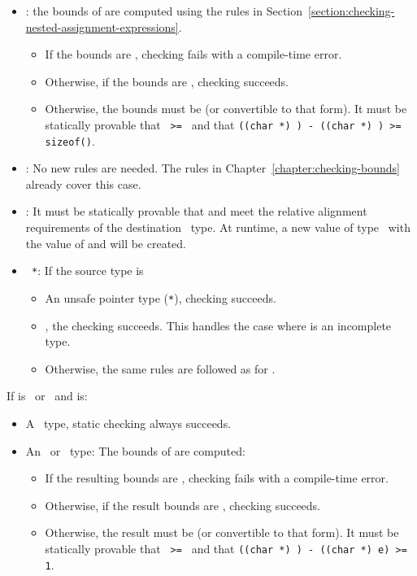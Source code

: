 \begin{itemize}
\item \ptrT: the bounds of  are computed using the rules
in Section~\ref{section:checking-nested-assignment-expressions}.
\begin{itemize}
\item If the bounds are \boundsnone, checking fails with a compile-time
error.
\item Otherwise, if the bounds are \boundsany, checking 
succeeds.
\item Otherwise, the bounds must be  (or convertible
to that form).  It must be statically provable that \texttt{ >= }
and that {\texttt{((char *) ) - ((char *) ) >= sizeof()}}.    
\end{itemize}
\item \arrayptrT: No new rules are needed.   The rules in
Chapter~\ref{chapter:checking-bounds} already cover this case.
\item \arrayviewT: It must be statically provable that 
and  meet the relative alignment requirements of
the destination \arrayview\ type.  At runtime, a new value of
type \arrayviewT\ with the value of  and  will be created.
\item \texttt{ *}: If the source type  is
\begin{itemize}
\item An unsafe pointer type (\texttt{*}), checking succeeds.
\item \ptrT, the checking succeeds. This handles the case where 
is an incomplete type.
\item Otherwise, the same rules are followed as for \ptrT.
\end{itemize}
\end{itemize}

If  is \ptrvoid\ or \unsafeptrvoid\ and  is:
\begin{itemize}
\item A \ptr\ type, static checking always succeeds.
\item An \arrayptr\ or \arrayview\ type: The bounds of  are computed:
\begin{itemize}
\item If the resulting bounds are \boundsnone, checking fails with a compile-time
error.
\item Otherwise, if the result bounds are \boundsany, checking 
succeeds.
\item Otherwise, the result must be  (or convertible
to that form).   It must be statically provable that \texttt{ >= }
and that {\texttt{((char *) ) - ((char *) e) >= 1}}.   
\end{itemize}
\end{itemize}


